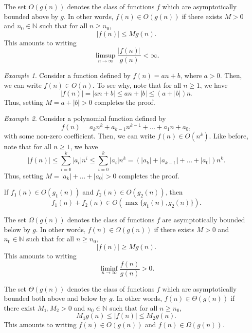 \documentclass[11pt]{article}
\newcommand{\N}{\mathbb{N}}
\theoremstyle{definition}
\theoremstyle{remark}
\newtheorem*{example}{Example}
\numberwithin{equation}{section}
\begin{document}
    \begin{definition}
        The set $O(g(n))$ denotes the class of functions $f$ which are asymptotically
        bounded above by $g$. In other words, $f(n) \in O(g(n))$ if there exists $M >
        0$ and $n_0 \in \N$ such that for all $n \geq n_0$, \[
            |f(n)| \leq M g(n).
        \] This amounts to writing \[
            \limsup_{n \to \infty} \frac{|f(n)|}{g(n)} < \infty.
        \] 
    \end{definition}
    \begin{example}
        Consider a function defined by $f(n) = an + b$, where $a > 0$. Then, we can
        write $f(n) \in O(n)$. To see why, note that for all $n \geq 1$, we have \[
            |f(n)| = |an + b| \leq an + |b| \leq (a + |b|)n.
        \] Thus, setting $M = a + |b| > 0$ completes the proof.
    \end{example}
    \begin{example}
        Consider a polynomial function defined by \[
            f(n) = a_kn^k + a_{k - 1}n^{k - 1} + \dots + a_1n + a_0,
        \] with some non-zero coefficient. Then, we can write $f(n) \in O(n^k)$. Like
        before, note that for all $n \geq 1$, we have \[
            |f(n)| \leq \sum_{i = 0}^k |a_{i}|n^i \leq \sum_{i = 0}^k |a_i| n^k =
            (|a_k| + |a_{k - 1}| + \dots + |a_0|)n^k.
        \]  Thus, setting $M = |a_k| + \dots + |a_0| > 0$ completes the proof.
    \end{example}

    \begin{theorem}
        If $f_1(n) \in O(g_1(n))$ and $f_2(n) \in O(g_2(n))$, then \[
            f_1(n) + f_2(n) \in O(\max\{g_1(n), g_2(n)\}).
        \]
    \end{theorem}

    \begin{definition}
        The set $\Omega(g(n))$ denotes the class of functions $f$ are asymptotically
        bounded below by $g$. In other words, $f(n) \in \Omega(g(n))$ if there exists
        $M > 0$ and $n_0 \in \N$ such that for all $n \geq n_0$, \[
            |f(n)| \geq M g(n).
        \] This amounts to writing \[
            \liminf_{n \to \infty} \frac{f(n)}{g(n)} > 0.
        \] 
    \end{definition}

    \begin{definition}
        The set $\Theta(g(n))$ denotes the class of functions $f$ which are
        asymptotically bounded both above and below by $g$.  In other words, $f(n)
        \in \Theta(g(n))$ if there exist $M_1, M_2 > 0$ and $n_0 \in \N$ such that
        for all $n \geq n_0$, \[
            M_1 g(n) \leq |f(n)| \leq M_2 g(n).
        \] This amounts to writing $f(n) \in O(g(n))$ and $f(n) \in \Omega(g(n))$.
    \end{definition}
    
\end{document}
